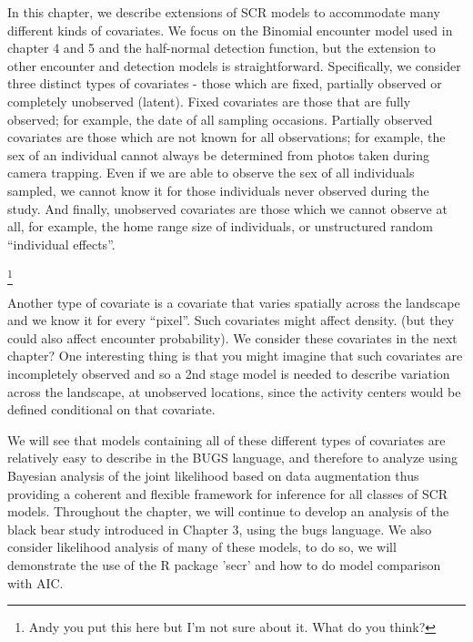In this chapter, we describe extensions of SCR models to accommodate many different kinds of covariates. We focus on the Binomial encounter model used in chapter 4 and 5 and the half-normal detection function, but the extension to other encounter and detection models is straightforward.  Specifically, we consider three distinct types of covariates - those which are fixed, partially observed or completely unobserved (latent).  Fixed covariates are those that are fully observed; for example, the date of all sampling occasions.  Partially observed covariates are those which are not known for all observations; for example, the sex of an individual cannot always be determined from photos taken during camera trapping.  Even if we are able to observe the sex of all individuals sampled, we cannot know it for those individuals never observed during the study.  And finally, unobserved covariates are those which we cannot observe at all, for example, the home range size of individuals, or unstructured random ``individual effects''. 


\footnote{Andy you put this here but I'm not sure about
  it. What do you think?} 

Another type of covariate is a covariate that varies spatially across the landscape and we know it for every ``pixel''. Such covariates might affect density. (but they could also affect encounter probability). We consider these covariates in the next chapter?  One interesting thing is that you might imagine that such covariates are incompletely observed and so a 2nd stage model is needed to describe variation across the landscape, at unobserved locations, since the activity centers would be defined conditional on that covariate. 

We will see that models containing all of these different types of covariates are relatively easy to describe in the BUGS language, and therefore to analyze using Bayesian analysis of the joint likelihood based on data augmentation thus providing a coherent and flexible framework for inference for all classes of SCR models.   Throughout the chapter, we will continue to develop an analysis of the black bear study introduced in Chapter 3, using the bugs language.  We also consider likelihood analysis of many of these models, to do so, we will demonstrate the use of the R package 'secr' and how to do model comparison with AIC.  

